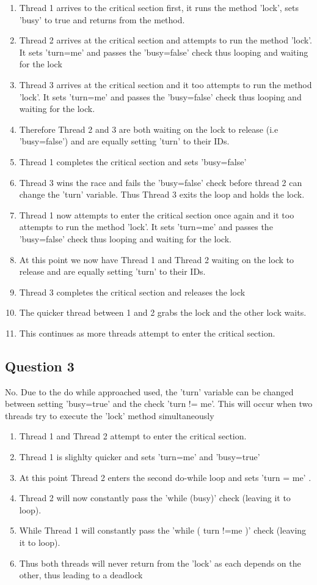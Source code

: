 \begin{enumerate}
\item Thread 1 arrives to the critical section first, it runs the method 'lock', 
sets 'busy' to true and returns from the method.
\item Thread 2 arrives at the critical section and attempts to run the method 
'lock'. It sets 'turn=me' and passes the 'busy=false' check thus looping and 
waiting for the lock
\item Thread 3 arrives at the critical section and it too attempts to run the 
method 'lock'. It sets 'turn=me' and passes the 'busy=false' check thus looping 
and waiting for the lock.
\item Therefore Thread 2 and 3 are both waiting on the lock to release 
(i.e 'busy=false') and are equally setting 'turn' to their IDs.
\item Thread 1 completes the critical section and sets 'busy=false'
\item Thread 3 wins the race and fails the 'busy=false' check before thread 2 
can change the 'turn' variable. Thus Thread 3 exits the loop and holds the lock.
\item Thread 1 now attempts to enter the critical section once again and it too 
attempts to run the method 'lock'. It sets 'turn=me' and passes the 'busy=false' 
check thus looping and waiting for the lock.
\item At this point we now have Thread 1 and Thread 2 waiting on the lock to 
release and are equally setting 'turn' to their IDs.
\item Thread 3 completes the critical section and releases the lock
\item The quicker thread between 1 and 2 grabs the lock and the other lock waits.
\item This continues as more threads attempt to enter the critical section.
\end{enumerate}

\subsection{Question 3}

No. Due to the do while approached used, the 'turn' variable can be changed 
between setting 'busy=true' and the check 'turn != me'. This will occur when two 
threads try to execute the 'lock' method simultaneously

\begin{enumerate}
\item Thread 1 and Thread 2 attempt to enter the critical section.
\item Thread 1 is slighlty quicker and sets 'turn=me' and 'busy=true'
\item At this point Thread 2 enters the second do-while loop and sets 'turn = me' .
\item Thread 2 will now constantly pass the 'while (busy)' check (leaving it to loop).
\item While Thread 1 will constantly pass the 'while ( turn !=me )' check (leaving it to loop).
\item Thus both threads will never return from the 'lock' as each depends on the other, thus leading to a deadlock
\end{enumerate}